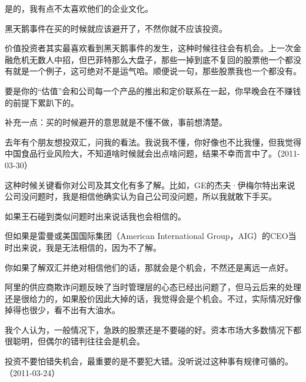 
是的，我有点不太喜欢他们的企业文化。




黑天鹅事件在买的时候就应该避开了，不然你就不应该投资。

价值投资者其实最喜欢看到黑天鹅事件的发生，这种时候往往会有机会。上一次金融危机无数人中招，但巴菲特那么大盘子，那些一掉到底不复回的股票他一个都没有就是一个例子，这可绝对不是运气哈。顺便说一句，那些股票我也一个都没有。

要是你的“估值”会和公司每一个产品的推出和定价联系在一起，你早晚会在不赚钱的前提下累趴下的。

补充一点：买的时候避开的意思就是不懂不做，事前想清楚。

去年有个朋友想投双汇，问我的看法。我说我不懂，你好像也不比我懂，但我觉得中国食品行业风险大，不知道啥时候就会出点啥问题，结果不幸而言中了。（2011-03-30）


这种时候关键看你对公司及其文化有多了解。比如，GE的杰夫·伊梅尔特出来说公司没问题时，我是相信他确实认为自己公司没问题，所以我就敢下手买。

如果王石碰到类似问题时出来说话我也会相信的。

但如果是雷曼或美国国际集团（American International Group，AIG）的CEO当时出来说，我是无法相信的，因为不了解。

你如果了解双汇并绝对相信他们的话，那就会是个机会，不然还是离远一点好。

阿里的供应商欺诈问题反映了当时管理层的心态已经出问题了，但马云后来的处理还是很给力的，如果股价因此大掉的话，我觉得会是个机会。不过，实际情况好像掉得也很少，看不出有大油水。

我个人认为，一般情况下，急跌的股票还是不要碰的好。资本市场大多数情况下都很聪明，但偶尔的错判往往会是机会。

投资不要怕错失机会，最重要的是不要犯大错。没听说过这种事有规律可循的。（2011-03-24）

